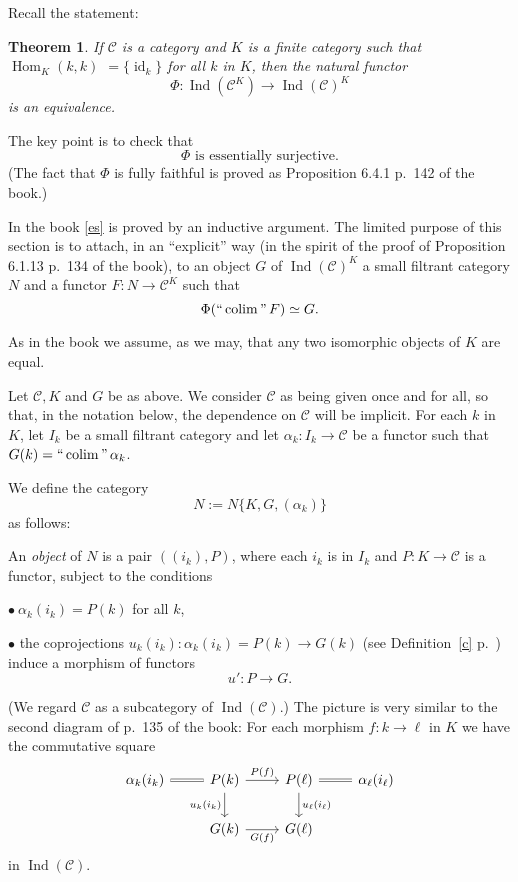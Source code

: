 \documentclass[12pt]{article}%
\newtheorem{thm}{Theorem}%
\theoremstyle{remark}
\theoremstyle{definition}
\newcommand{\bu}{\bullet}
\newcommand{\nn}{\noindent}
\newcommand{\C}{\mathcal C}
\DeclareMathOperator*{\colim}{colim}%
\DeclareMathOperator*{\ic}{``\colim"}
\DeclareMathOperator{\id}{id}
\DeclareMathOperator{\Hom}{Hom}%
\DeclareMathOperator{\Ind}{Ind}
\begin{document}
Recall the statement: 
%
\begin{thm}\label{643}
If $\C$ is a category and $K$ is a finite category such that $\Hom_K(k,k)$ $=\{\id_k\}$ for all $k$ in $K$, then the natural functor 
$$
\Phi:\Ind(\C^K)\to\Ind(\C)^K
$$ 
is an equivalence.
\end{thm}

The key point is to check that 
%
\begin{equation}\label{es} 
\Phi\text{ is essentially surjective.} 
\end{equation} 
%
(The fact that $\Phi$ is fully faithful is proved as Proposition 6.4.1 p.~142 of the book.) 

In the book \eqref{es} is proved by an inductive argument. The limited purpose of this section is to attach, in an ``explicit'' way (in the spirit of the proof of Proposition 6.1.13 p.~134 of the book), to an object $G$ of $\Ind(\C)^K$ a small filtrant category $N$ and a functor $F:N\to\C^K$ such that 
$$ 
\Phi(\ic F)\simeq G. 
$$ 

As in the book we assume, as we may, that any two isomorphic objects of $K$ are equal. 

Let $\C,K$ and $G$ be as above. We consider $\C$ as being given once and for all, so that, in the notation below, the dependence on $\C$ will be implicit. For each $k$ in $K$, let $I_k$ be a small filtrant category and let $\alpha_k:I_k\to\C$ be a functor such that $G(k)=\ic\alpha_k$. 

We define the category 
$$
N:=N\{K,G,(\alpha_k)\}
$$ 
as follows:

\nn[Beginning of the definition of the category $N:=N\{K,G,(\alpha_k)\}$.] An \emph{object} of $N$ is a pair $((i_k),P)$, where each $i_k$ is in $I_k$ and $P:K\to\C$ is a functor, subject to the conditions 

\nn$\bu\ \alpha_k(i_k)=P(k)$ for all $k$, 

\nn$\bu$ the coprojections $u_k(i_k):\alpha_k(i_k)=P(k)\to G(k)$ (see Definition~\ref{c} p.~\pageref{c}) induce a morphism of functors 
%
\begin{equation}\label{u':}
u':P\to G.
\end{equation}

\nn(We regard $\C$ as a subcategory of $\Ind(\C)$.) The picture is very similar to the second diagram of p.~135 of the book: For each morphism $f:k\to\ell$ in $K$ we have the commutative square 
$$ 
\begin{tikzcd} 
\alpha_k(i_k)\ar[equal]{r}&P(k)\ar{r}{P(f)}\ar{d}[swap]{u_k(i_k)}&P(\ell)\ar{d}{u_\ell(i_\ell)}\ar[equal]{r}&\alpha_\ell(i_\ell)\\ 
{}&G(k)\ar{r}[swap]{G(f)}&G(\ell) 
\end{tikzcd} 
$$ 
in $\Ind(\C)$. 
\end{document}
